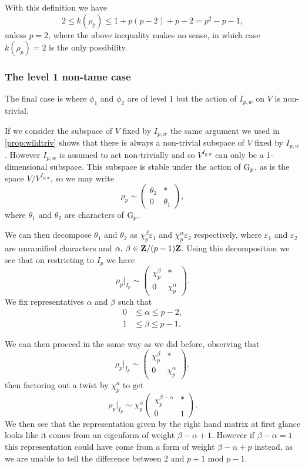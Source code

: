 \documentclass[a4paper,12pt]{article}
\begin{document}
With this definition we have
\[
2\le k(\rho_p) \le 1 + p(p-2) + p-2 = p^2 - p - 1,
\]
unless $p = 2$, where the above inequality makes no sense, in which case $k(\rho_p) = 2$ is the only possibility.


\subsubsection{The level 1 non-tame case}\label{sec:l1nt}
The final case is where $\phi_1$ and $\phi_2$ are of level 1 but the action of $I_{p,w}$ on $V$ is non-trivial.

If we consider the subspace of $V$ fixed by $I_{p,w}$ the same argument we used in \cref{prop:wildtriv} shows that there is always a non-trivial subspace of $V$ fixed by $I_{p,w}$.
However $I_{p,w}$ is assumed to act non-trivially and so $V^{I_{p,w}}$ can only be a 1-dimensional subspace.
This subspace is stable under the action of $\mathrm{G}_p$, as is the space $V/V^{I_{p,w}}$, so we may write %
\[
\rho_p \sim \begin{pmatrix}
\theta_2 & * \\
0        & \theta_1 \end{pmatrix},
\]
where $\theta_1$ and $\theta_2$ are characters of $\mathrm{G}_p$.

We can then decompose $\theta_1$ and $\theta_2$ as $\chi_p^\beta \varepsilon_1$ and $\chi_p^\alpha \varepsilon_2$ respectively, where $\varepsilon_1$ and $\varepsilon_2$ are unramified characters and $\alpha,\,\beta \in \mathbf{Z}/(p-1)\mathbf{Z}$.
Using this decomposition we see that on restricting to $I_p$ we have
\[
\rho_p|_{I_p} \sim \begin{pmatrix}
\chi_p^\beta & * \\
0          & \chi_p^\alpha \end{pmatrix}.
\]
We fix representatives $\alpha$ and $\beta$ such that
\begin{align*}
0&\le \alpha \le p - 2,\\
1&\le \beta \le p - 1.
\end{align*}

We can then proceed in the same way as we did before, observing that
\[
\rho_p|_{I_{p}} \sim \begin{pmatrix}
\chi_p^\beta & * \\
0        & \chi_p^\alpha \end{pmatrix},
\]
then factoring out a twist by $\chi_p^a$ to get
\[
\rho_p|_{I_{p}} \sim \chi_p^\alpha \begin{pmatrix}
\chi_p^{\beta - \alpha}& * \\
0        & 1 \end{pmatrix}.
\]
We then see that the representation given by the right hand matrix at first glance looks like it comes from an eigenform of weight $\beta - \alpha + 1$.
However if $\beta - \alpha = 1$ this representation could have come from a form of weight $\beta - \alpha + p$ instead, as we are unable to tell the difference between 2 and $p + 1$ mod $p -1$.
\end{document}
